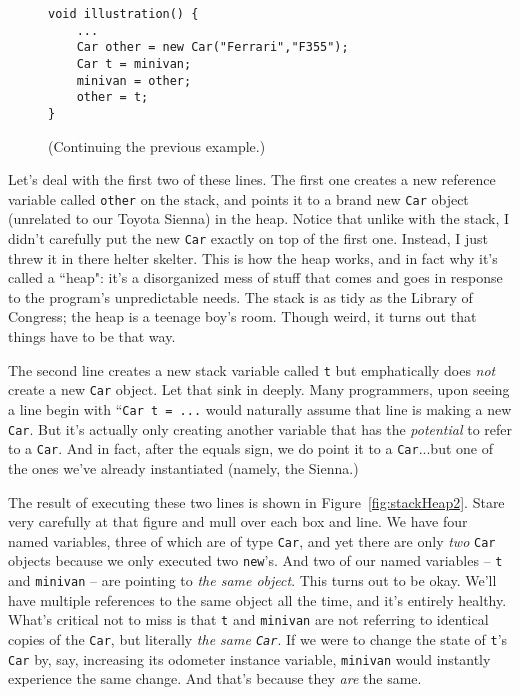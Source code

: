 \begin{figure}[ht]
\begin{Verbatim}[fontsize=\small,samepage=true,frame=single]
void illustration() {
    ...
    Car other = new Car("Ferrari","F355");
    Car t = minivan;
    minivan = other;
    other = t;
}
\end{Verbatim}
\caption{(Continuing the previous example.)}
\label{fig:additionalCode}
\end{figure}

Let's deal with the first two of these lines. The first one creates a new
reference variable called \texttt{other} on the stack, and points it to a
brand new \texttt{Car} object (unrelated to our Toyota Sienna) in the heap.
Notice that unlike with the stack, I didn't carefully put the new \texttt{Car}
exactly on top of the first one. Instead, I just threw it in there helter
skelter. This is how the heap works, and in fact why it's called a ``heap":
it's a disorganized mess of stuff that comes and goes in response to the
program's unpredictable needs. The stack is as tidy as the Library of
Congress; the heap is a teenage boy's room. Though weird, it turns out that
things have to be that way.

The second line creates a new stack variable called \texttt{t} but
emphatically does \textit{not} create a new \texttt{Car} object. Let that sink
in deeply. Many programmers, upon seeing a line begin with ``\texttt{Car t =
...} would naturally assume that line is making a new \texttt{Car}. But it's
actually only creating another variable that has the \textit{potential} to
refer to a \texttt{Car}. And in fact, after the equals sign, we do point it to
a \texttt{Car}...but one of the ones we've already instantiated (namely, the
Sienna.)

The result of executing these two lines is shown in
Figure~\ref{fig:stackHeap2}. Stare very carefully at that figure and mull over
each box and line. We have four named variables, three of which are of type
\texttt{Car}, and yet there are only \textit{two} \texttt{Car} objects because
we only executed two \texttt{new}'s. And two of our named variables --
\texttt{t} and \texttt{minivan} -- are pointing to \textit{the same object}.
This turns out to be okay. We'll have multiple references to the same object
all the time, and it's entirely healthy. What's critical not to miss is that
\texttt{t} and \texttt{minivan} are not referring to identical copies of the
\texttt{Car}, but literally \textit{the same \texttt{Car}}. If we were to
change the state of \texttt{t}'s \texttt{Car} by, say, increasing its odometer
instance variable, \texttt{minivan} would instantly experience the same
change. And that's because they \textit{are} the same. 

